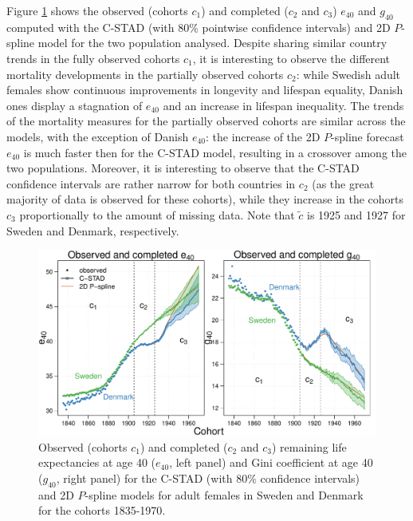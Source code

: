 \documentclass[11pt, a4paper]{article}
\begin{document}
Figure \ref{Fig:CSTADforeE40G40} shows the observed (cohorts $c_1$) and completed ($c_2$ and $c_3$) $e_{40}$ and $g_{40}$ computed with the C-STAD (with 80\% pointwise confidence intervals) and 2D $P$-spline model for the two population analysed. Despite sharing similar country trends in the fully observed cohorts $c_1$, it is interesting to observe the different mortality developments in the partially observed cohorts $c_2$: while Swedish adult females show continuous improvements in longevity and lifespan equality, Danish ones display a stagnation of $e_{40}$ and an increase in lifespan inequality. The trends of the mortality measures for the partially observed cohorts are similar across the models, with the exception of Danish $e_{40}$: the increase of the 2D $P$-spline forecast $e_{40}$ is much faster then for the C-STAD model, resulting in a crossover among the two populations. Moreover, it is interesting to observe that the C-STAD confidence intervals are rather narrow for both countries in $c_2$ (as the great majority of data is observed for these cohorts), while they increase in the cohorts $c_3$ proportionally to the amount of missing data. Note that $\tilde{c}$ is 1925 and 1927 for Sweden and Denmark, respectively.  

\begin{figure}[t]
	\begin{center}
		\includegraphics[scale=0.57]{./Figures/F5.pdf} 
		\caption{Observed (cohorts $c_1$) and completed ($c_2$ and $c_3$) remaining life expectancies at age 40 ($e_{40}$, left panel) and Gini coefficient at age 40 ($g_{40}$, right panel) for the C-STAD (with 80\% confidence intervals) and 2D $P$-spline models for adult females in Sweden and Denmark for the cohorts 1835-1970.\label{Fig:CSTADforeE40G40}}    
	\end{center}
\end{figure}
\end{document}
